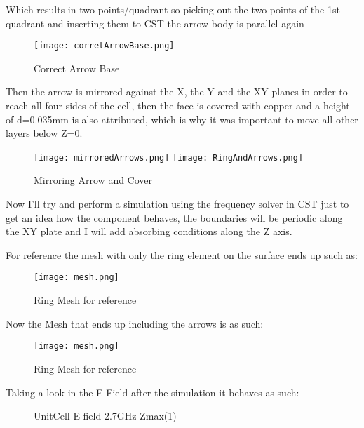         Which results in two points/quadrant so picking out the two points of the 1st quadrant and 
        inserting them to CST the arrow body is parallel again 
        \begin{figure}[h]
            \centering
            \texttt{[image: corretArrowBase.png]}
            \caption{Correct Arrow Base}
            \label{img:corretArrowBase}
        \end{figure}

        Then the arrow is mirrored against the X, the Y and the XY planes in order to reach all four 
        sides of the cell, then the face is covered with copper and a height of d=0.035mm is also 
        attributed, which is why it was important to move all other layers below Z=0. 
        \begin{figure}[h]
            \centering
            \texttt{[image: mirroredArrows.png]}\hfil
            \texttt{[image: RingAndArrows.png]}
            \caption{Mirroring Arrow and Cover}
            \label{img:mirrorAndCover}
        \end{figure}
        

        Now I'll try and perform a simulation using the frequency solver in CST just to get an idea 
        how the component behaves, the boundaries will be periodic along the XY plate and I will add
        absorbing conditions along the Z axis.

        For reference the mesh with only the ring element on the surface ends up such as: 
        
        \begin{figure}[h]
            \centering
            \texttt{[image: mesh.png]}
            \caption{Ring Mesh for reference}
            \label{img:ringMesh}
        \end{figure}

        Now the Mesh that ends up including the arrows is as such:
        \begin{figure}[h]
            \centering
            \texttt{[image: mesh.png]}
            \caption{Ring Mesh for reference}
            \label{img:RingAndArrowMesh}
        \end{figure}

        Taking a look in the E-Field after the simulation it behaves as such:
        \begin{figure}[h]
            \centering
            \caption{UnitCell E field 2.7GHz Zmax(1)}
            \label{fig:UnitCell_E_27e2MHz_Zmax1}
        \end{figure}

